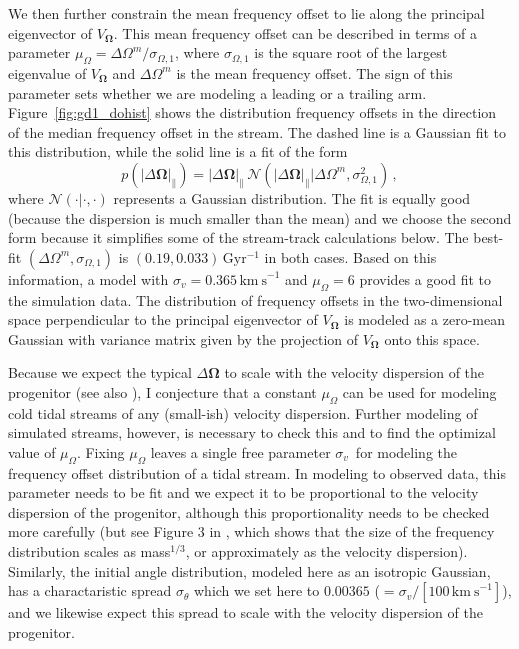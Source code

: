 \documentclass[12pt,preprint]{aastex}
\renewcommand{\figurename}{Figure}
\renewcommand{\vec}[1]{\ensuremath{\mathbf{#1}}}
\newcommand{\veco}{\ensuremath{\vec{\Omega}}}
\newcommand{\sigv}{\ensuremath{\sigma_v}}
\newcommand{\Gyr}{\ensuremath{\,\mathrm{Gyr}}}
\newcommand{\kms}{\ensuremath{\,\mathrm{km\ s}^{-1}}}
\newcommand{\inv}{\ensuremath{^{-1}}}
\begin{document}
We then further constrain the mean frequency offset to lie along the
principal eigenvector of $V_\veco$. This mean frequency offset can be
described in terms of a parameter $\mu_\Omega = \Delta \Omega^m /
\sigma_{\Omega,1}$, where $\sigma_{\Omega,1}$ is the square root of
the largest eigenvalue of $V_\veco$ and $\Delta \Omega^m$ is the mean
frequency offset. The sign of this parameter sets whether we are
modeling a leading or a trailing arm. \figurename~\ref{fig:gd1_dohist}
shows the distribution frequency offsets in the direction of the
median frequency offset in the stream. The dashed line is a Gaussian
fit to this distribution, while the solid line is a fit of the form
\begin{equation}\label{eq:do}
  p(|\Delta \veco|_\parallel) = |\Delta \veco|_\parallel\,\mathcal{N}\left(|\Delta \veco|_\parallel|\Delta \Omega^m,\sigma_{\Omega,1}^2\right)\,,
\end{equation}
where $\mathcal{N}(\cdot|\cdot,\cdot)$ represents a Gaussian
distribution. The fit is equally good (because the dispersion is much
smaller than the mean) and we choose the second form because it
simplifies some of the stream-track calculations below. The best-fit
$(\Delta \Omega^m,\sigma_{\Omega,1})$ is $(0.19,0.033)\Gyr\inv$ in
both cases. Based on this information, a model with $\sigv =
0.365\kms$ and $\mu_\Omega = 6$ provides a good fit to the simulation
data. The distribution of frequency offsets in the two-dimensional
space perpendicular to the principal eigenvector of $V_\veco$ is
modeled as a zero-mean Gaussian with variance matrix given by the
projection of $V_\veco$ onto this space.

Because we expect the typical $\Delta\veco$ to scale with the
velocity dispersion of the progenitor (see also \citealt{Sanders13a}),
I conjecture that a constant $\mu_\Omega$ can be used for modeling
cold tidal streams of any (small-ish) velocity dispersion. Further
modeling of simulated streams, however, is necessary to check this and
to find the optimizal value of $\mu_\Omega$. Fixing $\mu_\Omega$
leaves a single free parameter \sigv\ for modeling the frequency
offset distribution of a tidal stream. In modeling to observed data,
this parameter needs to be fit and we expect it to be proportional to
the velocity dispersion of the progenitor, although this
proportionality needs to be checked more carefully (but see Figure 3
in \citealt{Sanders13a}, which shows that the size of the frequency
distribution scales as mass$^{1/3}$, or approximately as the velocity
dispersion). Similarly, the initial angle distribution, modeled here
as an isotropic Gaussian, has a charactaristic spread $\sigma_{\theta}$
which we set here to $0.00365$ ($=\sigv/[100\kms]$), and we likewise
expect this spread to scale with the velocity dispersion of the
progenitor.
\end{document}

